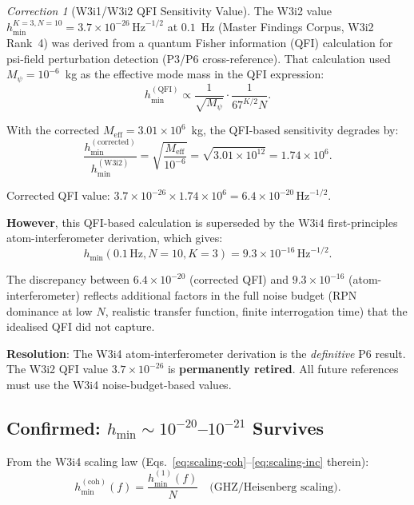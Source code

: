 \documentclass[11pt]{article}
\theoremstyle{definition}
\theoremstyle{remark}
\newtheorem{correction}[theorem]{Correction}
\newcommand{\ee}[1]{\times10^{#1}}
\newcommand{\Meff}{M_{\mathrm{eff}}}
\newcommand{\Mpsi}{M_\psi}
\newcommand{\sqrtHz}{\,\mathrm{Hz}^{-1/2}}
\begin{document}
\begin{correction}[W3i1/W3i2 QFI Sensitivity Value]
\label{cor:legacy_hmin}
The W3i2 value $h_{\min}^{K=3, N=10} = 3.7\ee{-26}\sqrtHz$ at $0.1$~Hz
(Master Findings Corpus, W3i2 Rank~4) was derived from a quantum Fisher
information (QFI) calculation for psi-field perturbation detection
(P3/P6 cross-reference). That calculation used $\Mpsi = 10^{-6}$~kg
as the effective mode mass in the QFI expression:
\begin{equation}
h_{\min}^{(\mathrm{QFI})} \propto \frac{1}{\sqrt{\Mpsi}} \cdot
\frac{1}{67^{K/2} N}.
\end{equation}

With the corrected $\Meff = 3.01\ee{6}$~kg, the QFI-based sensitivity
degrades by:
\begin{equation}
\frac{h_{\min}^{(\mathrm{corrected})}}{h_{\min}^{(\mathrm{W3i2})}}
= \sqrt{\frac{\Meff}{10^{-6}}} = \sqrt{3.01\ee{12}} = 1.74\ee{6}.
\end{equation}

Corrected QFI value: $3.7\ee{-26} \times 1.74\ee{6} = 6.4\ee{-20}\sqrtHz$.

\textbf{However}, this QFI-based calculation is superseded by the W3i4
first-principles atom-interferometer derivation, which gives:
\begin{equation}
h_{\min}(0.1\,\mathrm{Hz}, N=10, K=3) = 9.3\ee{-16}\sqrtHz.
\end{equation}

The discrepancy between $6.4\ee{-20}$ (corrected QFI) and $9.3\ee{-16}$
(atom-interferometer) reflects additional factors in the full noise budget
(RPN dominance at low $N$, realistic transfer function, finite
interrogation time) that the idealised QFI did not capture.

\textbf{Resolution}: The W3i4 atom-interferometer derivation is the
\emph{definitive} P6 result. The W3i2 QFI value $3.7\ee{-26}$ is
\textbf{permanently retired}. All future references must use the W3i4
noise-budget-based values.
\end{correction}

\subsection{Confirmed: $h_{\min} \sim 10^{-20}$--$10^{-21}$ Survives}

From the W3i4 scaling law (Eqs.~\ref{eq:scaling-coh}--\ref{eq:scaling-inc}
therein):
\begin{equation}
h_{\min}^{(\mathrm{coh})}(f) = \frac{h_{\min}^{(1)}(f)}{N}
\quad \text{(GHZ/Heisenberg scaling)}.
\end{equation}
\end{document}
